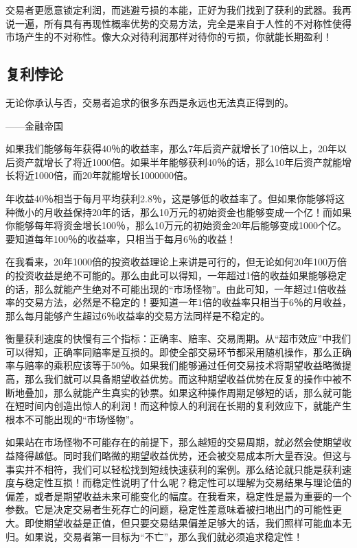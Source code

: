交易者更愿意锁定利润，而逃避亏损的本能，正好为我们找到了获利的武器。我再说一遍，所有具有再现性概率优势的交易方法，完全是来自于人性的不对称性使得市场产生的不对称性。像大众对待利润那样对待你的亏损，你就能长期盈利！

\subsection{复利悖论}

{\kaishu
无论你承认与否，交易者追求的很多东西是永远也无法真正得到的。

\hfill ——金融帝国
}

如果我们能够每年获得40％的收益率，那么7年后资产就增长了10倍以上，20年以后资产就增长了将近1000倍。如果半年能够获利40％的话，那么10年后资产就能增长将近1000倍，而20年就能增长1000000倍。

年收益40％相当于每月平均获利2.8％，这是够低的收益率了。但如果你能够将这种微小的月收益保持20年的话，那么10万元的初始资金也能够变成一个亿！而如果你能够每年将资金增长100％，那么10万元的初始资金20年后能够变成1000个亿。要知道每年100％的收益率，只相当于每月6％的收益！

在我看来，20年1000倍的投资收益理论上来讲是可行的，但无论如何20年100万倍的投资收益是绝不可能的。那么由此可以得知，一年超过1倍的收益如果能够稳定的话，那么就能产生绝对不可能出现的“市场怪物”。由此可知，一年超过1倍收益率的交易方法，必然是不稳定的！要知道一年1倍的收益率只相当于6％的月收益，那么每月能够产生超过6％收益率的交易方法同样是不稳定的。

衡量获利速度的快慢有三个指标：正确率、赔率、交易周期。从“超市效应”中我们可以得知，正确率同赔率是互损的。即使全部交易环节都采用随机操作，那么正确率与赔率的乘积应该等于50％。如果我们能够通过任何交易技术将期望收益略微提高，那么我们就可以具备期望收益优势。而这种期望收益优势在反复的操作中被不断地叠加，那么就能产生真实的钞票。如果这种操作周期足够短的话，那么就可能在短时间内创造出惊人的利润！而这种惊人的利润在长期的复利效应下，就能产生根本不可能出现的“市场怪物”。

如果站在市场怪物不可能存在的前提下，那么越短的交易周期，就必然会使期望收益降得越低。同时我们略微的期望收益优势，还会被交易成本所大量吞没。但这与事实并不相符，我们可以轻松找到短线快速获利的案例。那么结论就只能是获利速度与稳定性互损！而稳定性说明了什么呢？稳定性可以理解为交易结果与理论值的偏差，或者是期望收益未来可能变化的幅度。在我看来，稳定性是最为重要的一个参数。它是决定交易者生死存亡的问题，稳定性差意味着被扫地出门的可能性更大。即使期望收益是正值，但只要交易结果偏差足够大的话，我们照样可能血本无归。如果说，交易者第一目标为“不亡”，那么我们就必须追求稳定性！


